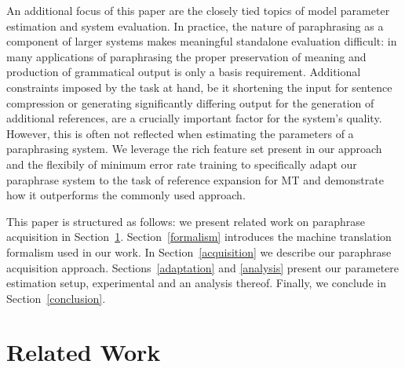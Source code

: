 \documentclass[11pt]{article}
\begin{document}
An additional focus of this paper are the closely tied topics of model
parameter estimation and system evaluation. In practice, the nature of
paraphrasing as a component of larger systems makes meaningful
standalone evaluation difficult: in many applications of paraphrasing
the proper preservation of meaning and production of grammatical
output is only a basis requirement. Additional constraints imposed by
the task at hand, be it shortening the input for sentence compression
or generating significantly differing output for the generation of
additional references, are a crucially important factor for the
system's quality. However, this is often not reflected when estimating
the parameters of a paraphrasing system. We leverage the rich feature
set present in our approach and the flexibily of minimum error rate
training to specifically adapt our paraphrase system to the task of
reference expansion for MT and demonstrate how it outperforms the
commonly used approach.

This paper is structured as follows: we present related work on
paraphrase acquisition in
Section~\ref{related_work}. Section~\ref{formalism} introduces the
machine translation formalism used in our work. In
Section~\ref{acquisition} we describe our paraphrase acquisition
approach. Sections~\ref{adaptation} and \ref{analysis} present our
parametere estimation setup, experimental and an analysis
thereof. Finally, we conclude in Section~\ref{conclusion}.

\section{Related Work} \label{related_work}
\end{document}
